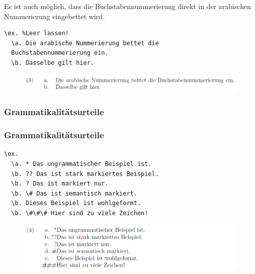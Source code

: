 \begin{frame}[fragile]

Es ist auch möglich, dass die Buchstabennummerierung direkt in der arabischen Nummerierung eingebettet wird.

\begin{lstlisting}
\ex. %Leer lassen!
  \a. Die arabische Nummerierung bettet die 
  Buchstabennummerierung ein.
  \b. Dasselbe gilt hier.
\end{lstlisting}

\begin{figure}
	\centering
	\includegraphics[scale=.4]{../../texfiles-beamer/tex-material/WissArb-latex/linguex2}
\end{figure}

\end{frame}


\subsubsection{Grammatikalitätsurteile}
\begin{frame}[fragile]

\frametitle{Grammatikalitätsurteile}

\begin{lstlisting}
\ex. 
  \a. * Das ungrammatischer Beispiel ist.
  \b. ?? Das ist stark markiertes Beispiel.
  \b. ? Das ist markiert nur.
  \b. \# Das ist semantisch markiert.
  \b. Dieses Beispiel ist wohlgeformt.
  \b. \#\#\# Hier sind zu viele Zeichen!

\end{lstlisting}

\begin{figure}
	\centering
	\includegraphics[scale=.4]{../../texfiles-beamer/tex-material/WissArb-latex/linguex3}
\end{figure}


\end{frame}


